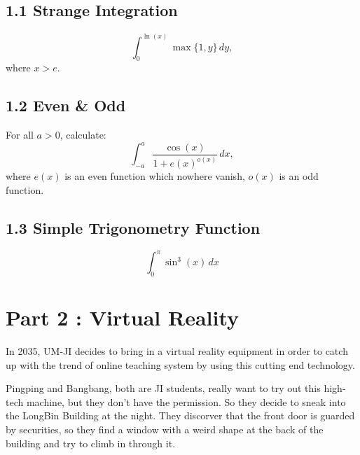 \documentclass[12pt]{article}
\begin{document}
\subsection*{1.1 Strange Integration}
\begin{equation*}
    \int^{\ln(x)}_0 \max \{1, y\}\,dy, 
\end{equation*}
where $x > e$.

\subsection*{1.2 Even \& Odd}
\par For all $a>0$, calculate:
\begin{equation*}
    \int^a_{-a} \frac{\cos(x)}{1 + e(x)^{o(x)}}\,dx, 
\end{equation*}
where $e(x)$ is an even function which nowhere vanish, $o(x)$ is an odd function.

\subsection*{1.3 Simple Trigonometry Function}
\begin{equation*}
    \int^\pi_0 \sin^3(x)\,dx
\end{equation*}

\newpage
\section*{Part 2 : Virtual Reality}
\par In 2035, UM-JI decides to bring in a virtual reality equipment in order to catch up with the trend of online 
teaching system by using this cutting end technology.

\par Pingping and Bangbang, both are JI students, really want to try out this high-tech machine, but they don't have the
permission. So they decide to sneak into the LongBin Building at the night. They discorver that the front door is 
guarded by securities, so they find a window with a weird shape at the back of the building and try to
climb in through it. 

\end{document}
